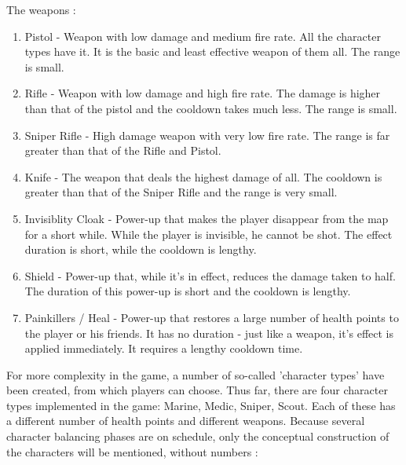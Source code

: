 The weapons : 
\begin{enumerate}
  \item Pistol - Weapon with low damage and medium fire rate. All the character
  types have it. It is the basic and least effective weapon of them all. The
  range is small.
  
  \item Rifle - Weapon with low damage and high fire rate. The damage is higher
  than that of the pistol and the cooldown takes much less. The range is small.
  
  \item Sniper Rifle - High damage weapon with very low fire rate. The range is
  far greater than that of the Rifle and Pistol.
  
  \item Knife - The weapon that deals the highest damage of all. The cooldown is
  greater than that of the Sniper Rifle and the range is very small.
   
  \item Invisiblity Cloak - Power-up that makes the player disappear from the
  map for a short while. While the player is invisible, he cannot be shot.
  The effect duration is short, while the cooldown is lengthy.
  
  \item Shield - Power-up that, while it's in effect, reduces the damage taken
  to half. The duration of this power-up is short and the cooldown is lengthy.
  
  \item Painkillers / Heal - Power-up that restores a large number of
  health points to the player or his friends. It has no duration - just like
  a weapon, it's effect is applied immediately. It requires a lengthy cooldown
  time.
  
\end{enumerate}

For more complexity in the game, a number of so-called 'character types' have
been created, from which players can choose. Thus far, there are four character
types implemented in the game: Marine, Medic, Sniper, Scout. Each of these has a
different number of health points and different weapons. Because several
character balancing phases are on schedule, only the conceptual construction of
the characters will be mentioned, without numbers :

